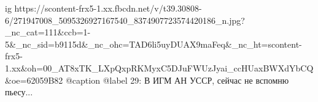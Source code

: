  
 
 
 
 

\ifcmt
  ig https://scontent-frx5-1.xx.fbcdn.net/v/t39.30808-6/271947008_5095326927167540_8374907723574420186_n.jpg?_nc_cat=111&ccb=1-5&_nc_sid=b9115d&_nc_ohc=TAD6li5uyDUAX9maFeq&_nc_ht=scontent-frx5-1.xx&oh=00_AT8xTK_LXpQxpRKMyxC5DJuFWUzJyai_ccHUaxBWXdYbCQ&oe=62059B82
  @caption @label 29: В ИГМ АН УССР, сейчас не вспомню пьесу...
\fi
